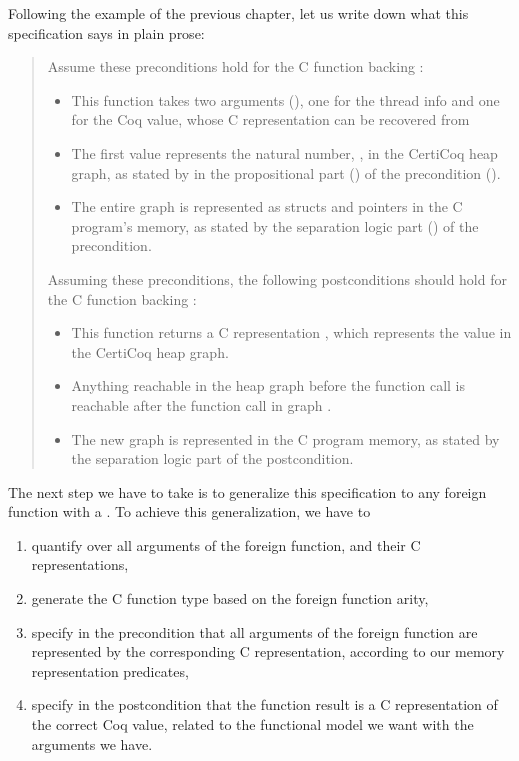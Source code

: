 Following the example of the previous chapter, let us write down what this specification says in plain prose: 

\begin{quote}
Assume these preconditions hold for the C function backing :
\begin{itemize}
\item This function takes two arguments (), one for the \gls{thread info} and one for the Coq value, whose C representation can be recovered from 
\item The first value  represents the natural number, , in the \gls{CertiCoq heap} graph,  as stated by  in the propositional part () of the precondition ().
\item The entire graph  is represented as structs and pointers in the C program's memory, as stated by the separation logic part () of the precondition.
\end{itemize}
Assuming these preconditions, the following postconditions should hold for the C function backing :
\begin{itemize}
\item This function returns a C representation , which represents the value  in the \gls{CertiCoq heap} graph.
\item Anything reachable in the heap graph  before the function call is reachable after the function call in graph .
\item The new graph  is represented in the C program memory, as stated by the separation logic part of the postcondition.
\end{itemize}
\end{quote}

The next step we have to take is to generalize this specification to any \gls{foreign function} with a \fndesc{}. To achieve this generalization, we have to
\begin{enumerate}
\item quantify over all arguments of the \gls{foreign function}, and their C representations, %
\item generate the C function type based on the \gls{foreign function} arity,
\item specify in the precondition that all arguments of the \gls{foreign function} are represented by the corresponding C representation, according to our memory representation predicates,
\item specify in the postcondition that the function result is a C representation of the correct Coq value, related to the \gls{functional model} we want with the arguments we have.
\end{enumerate}

